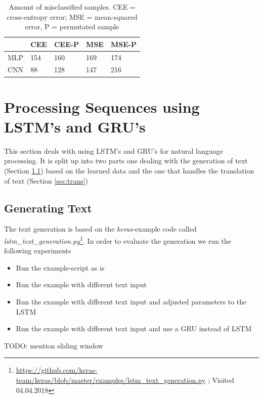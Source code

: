 \documentclass{article}
\begin{document}
\begin{table}[H]
	\centering
	\begin{tabular}{|l|l|l|l|l|}
		\hline
		& \cellcolor[HTML]{C0C0C0}CEE & \cellcolor[HTML]{C0C0C0}CEE-P & \cellcolor[HTML]{C0C0C0}MSE & \cellcolor[HTML]{C0C0C0}MSE-P \\ \hline
		\cellcolor[HTML]{C0C0C0}MLP & \cellcolor[HTML]{FFFFFF}154 & 160                           & 169                         & 174                           \\ \hline
		\cellcolor[HTML]{C0C0C0}CNN & 88                          & 128                           & 147                         & 216                           \\ \hline
	\end{tabular}
	\caption{Amount of misclassified samples. CEE = cross-entropy error; MSE = mean-squared error, P = permutated sample}
	\label{table-2}
\end{table}

\section{Processing Sequences using LSTM's and GRU's}
\label{sec:seq}
This section deals with using LSTM's and GRU's for natural language processing.
It is split up into two parts one dealing with the generation of text (Section \ref{sec:gen}) based on the learned data and the one that handles the translation of text (Section \ref{sec:trans})
\subsection{Generating Text}
\label{sec:gen}
The text generation is based on the \textit{keras}-example code called \textit{lstm\_text\_generation.py}\footnote{\url{https://github.com/keras-team/keras/blob/master/examples/lstm_text_generation.py} ; Visited 04.04.2018}.
In order to evaluate the generation we run the following experiments
\begin{itemize}
\item{Run the example-script as is}
\item{Run the example with different text input}
\item{Run the example with different text input and adjusted parameters to the LSTM}
\item{Run the example with different text input and use a GRU instead of LSTM}
\end{itemize}


TODO: mention sliding window
\end{document}
